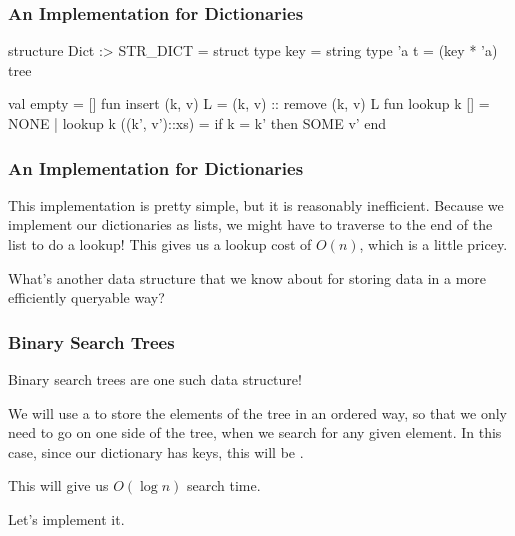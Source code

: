 \documentclass[aspectratio=169]{beamer}
\begin{document}
\begin{frame}[fragile]
  \frametitle{An Implementation for Dictionaries}

  \begin{codeblock}
    structure Dict :> STR_DICT =
      struct
        type key = string
        type 'a t = (key * 'a) tree

        val empty = []
        fun insert (k, v) L = (k, v) :: remove (k, v) L
        fun lookup k [] = NONE
          | lookup k ((k', v')::xs) =
              if k = k' then SOME v'
      end
  \end{codeblock}
\end{frame}

\begin{frame}[fragile]
  \frametitle{An Implementation for Dictionaries}

  This implementation is pretty simple, but it is reasonably
  inefficient. Because we implement our dictionaries as lists,
  we might have to traverse to the end of the list to do a
  lookup! This gives us a lookup cost of $O(n)$, which is a
  little pricey.

  \pause
  \vspace{\fill}

  What's another data structure that we know about for storing
  data in a more efficiently queryable way?
\end{frame}

\begin{frame}[fragile]
  \frametitle{Binary Search Trees}

  Binary search trees are one such data structure!

  \pause
  \vspace{\fill}

  We will use a  to store the elements
  of the tree in an ordered way, so that we only need to go on
  one side of the tree, when we search for any given element. In
  this case, since our dictionary has  keys, this
  will be .

  \pause
  \vspace{\fill}

  This will give us $O(\log n)$ search time\footnotemark.

  \pause
  \vspace{\fill}

  Let's implement it.

\end{frame}
\end{document}
